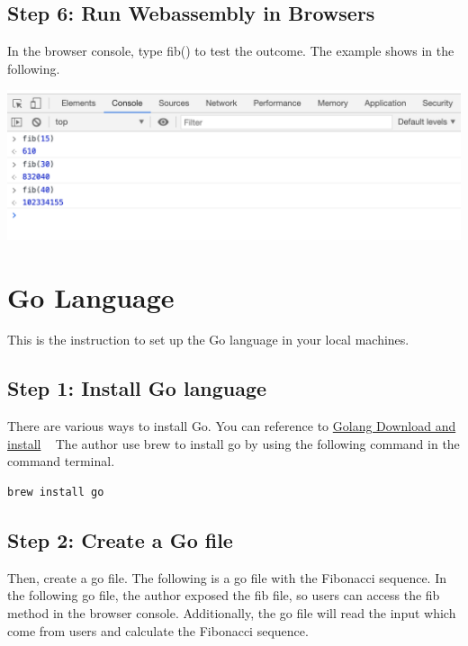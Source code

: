 \documentclass[12pt]{article}
\begin{document}
\subsection{Step 6: Run Webassembly in Browsers}
In the browser console, type fib() to test the outcome. The example shows in the following.
~\newline

\includegraphics[scale = 0.6]{img/as-browser}

\pagebreak
\section{Go Language}
This is the instruction to set up the Go language in your local machines.

\subsection{Step 1: Install Go language}
There are various ways to install Go. You can reference to \href{https://golang.org/doc/install}{Golang Download and install}
~\newline
The author use brew to install go by using the following command in the command terminal.
~\newline
\begin{verbatim}
brew install go
\end{verbatim}

\subsection{Step 2: Create a Go file}
Then, create a go file. The following is a go file with the Fibonacci sequence. In the following go file, the author exposed the 
fib file, so users can access the fib method in the browser console. Additionally, the go file will read the input which come 
from users and calculate the Fibonacci sequence.
~\newline
\end{document}
